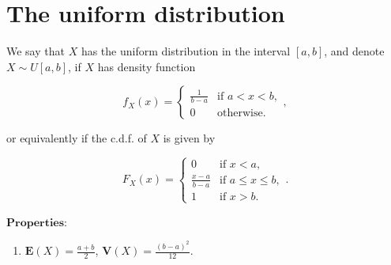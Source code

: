\section{The uniform distribution}

We say that $X$ has the uniform distribution in the
interval $[a,b]$, and denote $X\sim U[a,b]$, if $X$
has density function

\[
f_X(x) = \begin{cases} \frac{1}{b-a} & \textrm{if }a<x<b, \\ 0 & \textrm{otherwise}. \end{cases},
\]

\noindent or equivalently if the c.d.f. of $X$ is given by

\[
F_X(x) = \begin{cases} 0 & \textrm{if }x<a, \\
\frac{x-a}{b-a} & \textrm{if }a\le x\le b, \\
1 & \textrm{if }x>b. \end{cases}.
\]

\noindent $\textbf{Properties:}$

\begin{enumerate}[label=\arabic*.]
\item $\mathbf{E}(X) = \frac{a+b}{2}$,
$\mathbf{V}(X) = \frac{(b-a)^2}{12}$.
\end{enumerate}
